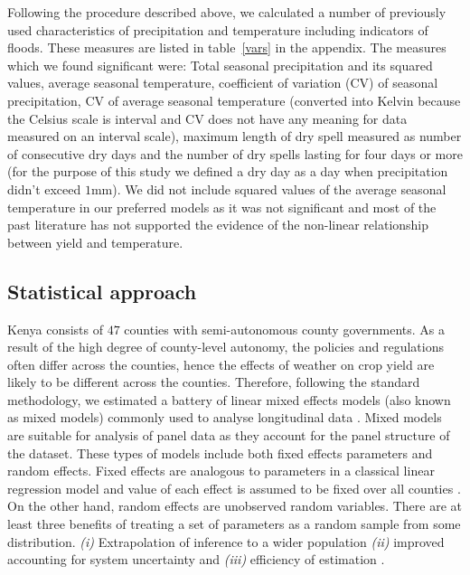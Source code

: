 \documentclass[12pt]{iopart}
\begin{document}
Following the procedure described above, we calculated a number of previously used characteristics of precipitation and temperature including indicators of floods. These measures are listed in table~\ref{vars} in the appendix. The measures which we found significant were: Total seasonal precipitation and its squared values, average seasonal temperature, coefficient of variation (CV) of seasonal precipitation, CV of average seasonal temperature (converted into Kelvin because the Celsius scale is interval and CV does not have any meaning for data measured on an interval scale),  maximum length of dry spell measured as number of consecutive dry days and the number of dry spells lasting for four days or more (for the purpose of this study we defined a dry day as a day when precipitation didn't exceed $1$mm). We did not include squared values of the average seasonal temperature in our preferred models as it was not significant and most of the past literature has not supported the evidence of the non-linear relationship between yield and temperature.
\subsection{Statistical approach}\label{stats}


\sloppy
Kenya consists of $47$ counties with semi-autonomous county governments. As a result of the high degree of county-level autonomy, the policies and regulations often differ across the counties, hence the effects of weather on crop yield are likely to be different across the counties. Therefore, following the standard methodology, we estimated a battery of linear mixed effects models (also known as mixed models) commonly used to analyse longitudinal data \cite{bates2000mixed}. Mixed models are suitable for analysis of panel data as they account for the panel structure of the dataset. These types of models include both fixed effects parameters and random effects. Fixed effects are analogous to parameters in a classical linear regression model and value of each effect is assumed to be fixed over all counties \cite{bates2010lme4}. On the other hand, random effects are unobserved random variables. There are at least three benefits of treating a set of parameters as a random sample from some distribution. \textit{(i)} Extrapolation of inference to a wider population \textit{(ii)} improved accounting for system uncertainty and \textit{(iii)} efficiency of estimation \cite{KERYch9,KERYch12}.
\end{document}

